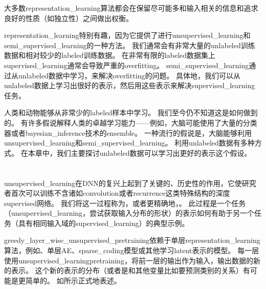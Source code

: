 大多数\gls{representation_learning}算法都会在保留尽可能多和输入相关的信息和追求良好的性质（如独立性）之间做出权衡。


\gls{representation_learning}特别有趣，因为它提供了进行\gls{unsupervised_learning}和\gls{semi_supervised_learning}的一种方法。
我们通常会有非常大量的\gls{unlabeled}训练数据和相对较少的\gls{labeled}训练数据。
在非常有限的\gls{labeled}数据集上\gls{supervised_learning}通常会导致严重的\gls{overfitting}。
\gls{semi_supervised_learning}通过从\gls{unlabeled}数据中学习，来解决\gls{overfitting}的问题。
具体地，我们可以从\gls{unlabeled}数据上学习出很好的表示，然后用这些表示来解决\gls{supervised_learning}任务。


人类和动物能够从非常少的\gls{labeled}样本中学习。
我们至今仍不知道这是如何做到的。
有许多假说解释人类的卓越学习能力——例如，大脑可能使用了大量的分类器或者\gls{bayesian_inference}技术的\gls{ensemble}。
一种流行的假说是，大脑能够利用\gls{unsupervised_learning}和\gls{semi_supervised_learning}。
利用\gls{unlabeled}数据有多种方式。
在本章中，我们主要探讨\gls{unlabeled}数据可以学习出更好的表示这个假设。


\section{}
\label{sec:greedy_layer_wise_unsupervised_pretraining}
\gls{unsupervised_learning}在\gls{DNN}的复兴上起到了关键的、历史性的作用，它使研究者首次可以训练不含诸如\gls{convolution}或者\gls{recurrence}这类特殊结构的深度\gls{supervised}网络。
我们将这一过程称为，或者更精确地，。
此过程是一个任务（\gls{unsupervised_learning}，尝试获取输入分布的形状）的表示如何有助于另一个任务（具有相同输入域的\gls{supervised_learning}）的典型示例。


\gls{greedy_layer_wise_unsupervised_pretraining}依赖于单层\gls{representation_learning}算法，例如、单层\gls{AE}、\gls{sparse_coding}模型或其他学习\gls{latent}表示的模型。
每一层使用\gls{unsupervised_learning}\gls{pretraining}，将前一层的输出作为输入，输出数据的新的表示。
这个新的表示的分布（或者是和其他变量比如要预测类别的关系）有可能是更简单的。
如所示正式地表述。



